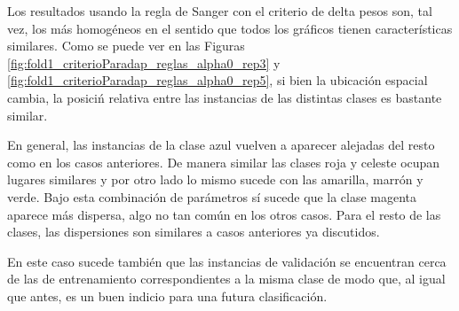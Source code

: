 \documentclass[informe.tex]{subfiles}
\begin{document}
      
      
      
      
	Los resultados usando la regla de Sanger con el criterio de delta pesos son, tal vez, los más homogéneos en el sentido que todos los gráficos tienen características similares. Como se puede ver en las Figuras \ref{fig:fold1_criterioParadap_reglas_alpha0_rep3} y \ref{fig:fold1_criterioParadap_reglas_alpha0_rep5}, si bien la ubicación espacial cambia, la posiciń relativa entre las instancias de las distintas clases es bastante similar. 
	
	En general, las instancias de la clase azul vuelven a aparecer alejadas del resto como en los casos anteriores. De manera similar las clases roja y celeste ocupan lugares similares y por otro lado lo mismo sucede con las amarilla, marrón y verde. Bajo esta combinación de parámetros sí sucede que la clase magenta aparece más dispersa, algo no tan común en los otros casos. Para el resto de las clases, las dispersiones son similares a casos anteriores ya discutidos.
	
	En este caso sucede también que las instancias de validación se encuentran cerca de las de entrenamiento correspondientes a la misma clase de modo que, al igual que antes, es un buen indicio para una futura clasificación.
 
\end{document}
